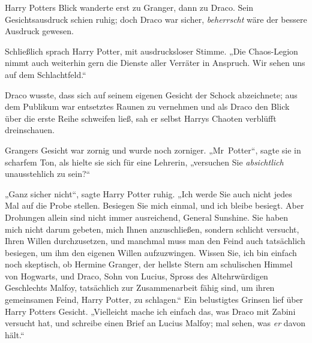 Harry Potters Blick wanderte erst zu Granger, dann zu Draco. Sein Gesichtsausdruck schien ruhig; doch Draco war sicher, \emph{beherrscht} wäre der bessere Ausdruck gewesen.

Schließlich sprach Harry Potter, mit ausdrucksloser Stimme.
„Die Chaos-Legion nimmt auch weiterhin gern die Dienste aller Verräter in Anspruch. Wir sehen uns auf dem Schlachtfeld.“

Draco wusste, dass sich auf seinem eigenen Gesicht der Schock abzeichnete; aus dem Publikum war entsetztes Raunen zu vernehmen und als Draco den Blick über die erste Reihe schweifen ließ, sah er selbst Harrys Chaoten verblüfft dreinschauen.

Grangers Gesicht war zornig und wurde noch zorniger.
„Mr~Potter“, sagte sie in scharfem Ton, als hielte sie sich für eine Lehrerin, „versuchen Sie \emph{absichtlich} unausstehlich zu sein?“

„Ganz sicher nicht“, sagte Harry Potter ruhig.
„Ich werde Sie auch nicht jedes Mal auf die Probe stellen. Besiegen Sie mich einmal, und ich bleibe besiegt. Aber Drohungen allein sind nicht immer ausreichend, General Sunshine. Sie haben mich nicht darum gebeten, mich Ihnen anzuschließen, sondern schlicht versucht, Ihren Willen durchzusetzen, und manchmal muss man den Feind auch tatsächlich besiegen, um ihm den eigenen Willen aufzuzwingen. Wissen Sie, ich bin einfach noch skeptisch, ob Hermine Granger, der hellste Stern am schulischen Himmel von Hogwarts, und Draco, Sohn von Lucius, Spross des Altehrwürdigen Geschlechts Malfoy, tatsächlich zur Zusammenarbeit fähig sind, um ihren gemeinsamen Feind, Harry Potter, zu schlagen.“ Ein belustigtes Grinsen lief über Harry Potters Gesicht.
„Vielleicht mache ich einfach das, was Draco mit Zabini versucht hat, und schreibe einen Brief an Lucius Malfoy; mal sehen, was \emph{er} davon hält.“

